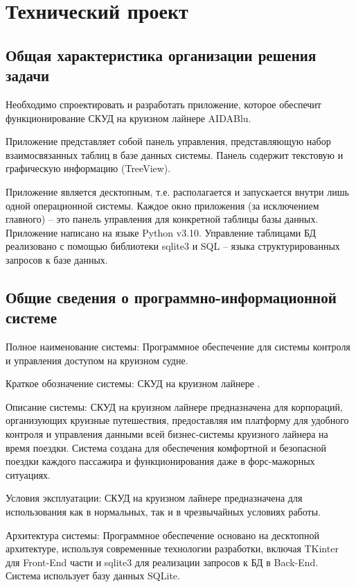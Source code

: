 \section{Технический проект}
\subsection{Общая характеристика организации решения задачи}

Необходимо спроектировать и разработать приложение, которое обеспечит функционирование СКУД на круизном лайнере AIDABlu.

Приложение представляет собой панель управления, представляющую набор взаимосвязанных таблиц в базе данных системы. Панель содержит текстовую и графическую информацию (TreeView).

Приложение является десктопным, т.е. располагается и запускается внутри лишь одной операционной системы. Каждое окно приложения (за исключением главного) – это панель управления для конкретной таблицы базы данных. Приложение написано на языке Python v3.10. Управление таблицами БД реализовано с помощью библиотеки sqlite3 и SQL -- языка структурированных запросов к базе данных.

\subsection{Общие сведения о программно-информационной системе}

Полное наименование системы: Программное обеспечение для системы контроля и управления доступом на круизном судне.

Краткое обозначение системы: \textquotedbl СКУД на круизном лайнере \textquotedbl.

Описание системы: \textquotedbl СКУД на круизном лайнере \textquotedbl предназначена для корпораций, организующих круизные путешествия, предоставляя им платформу для удобного контроля и управления данными всей бизнес-системы круизного лайнера на время поездки. Система создана для обеспечения комфортной и безопасной поездки каждого пассажира и функционирования даже в форс-мажорных ситуациях.

Условия эксплуатации: \textquotedbl СКУД на круизном лайнере \textquotedbl предназначена для использования как в нормальных, так и в чрезвычайных условиях работы.

Архитектура системы: Программное обеспечение основано на десктопной архитектуре, используя современные технологии разработки, включая TKinter для Front-End части и sqlite3 для реализации запросов к БД в Back-End. Система использует базу данных SQLite.

